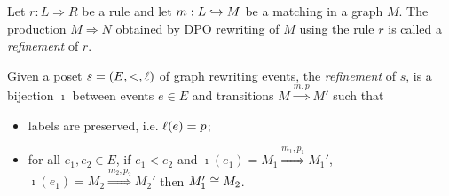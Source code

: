 \begin{definition}
  Let $r:L{\Rightarrow} R$ be a rule and let $m:L\hookrightarrow M$ be a matching in a graph $M$. The production $M\Rightarrow N$ obtained by DPO rewriting of $M$ using the rule $r$ is called a \emph{refinement} of $r$.
\end{definition}

\begin{definition}
  Given a poset $s=(E,<,\ell)$ of graph rewriting events, the \emph{refinement} of $s$, is a bijection $\imath$ between events $e\in E$ and transitions $M\overset{m,p}{\Rightarrow} M'$ such that
  \begin{itemize}
  \item labels are preserved, i.e. $\ell(e)=p$;
  \item for all $e_1,e_2\in E$, if $e_1<e_2$ and $\imath(e_1) = M_1\overset{m_1,p_1}{\Rightarrow} M_1'$, $\imath(e_1) =M_2\overset{m_2,p_2}{\Rightarrow} M_2'$ then $M_1'\cong M_2$.
  \end{itemize}
\end{definition}



